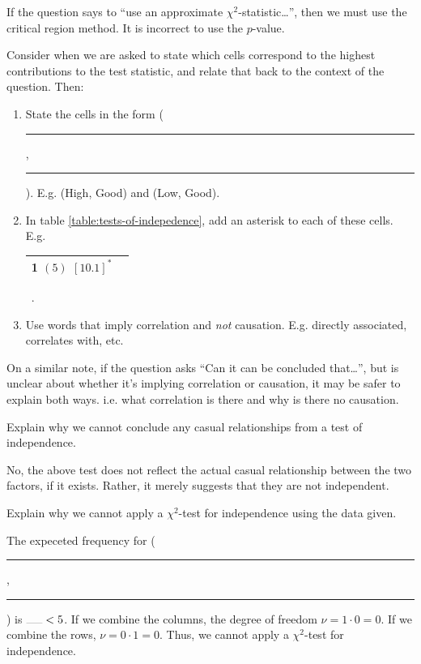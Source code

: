 \documentclass[../Notes.tex]{subfiles}
\begin{document}
\begin{note}
  If the question says to ``use an approximate \(\chi^2\)-statistic\dots'', then we must use the critical region method. It is incorrect to use the \(p\)-value.
\end{note}
\begin{note}
  Consider when we are asked to state which cells correspond to the highest contributions to the test statistic, and relate that back to the context of the question. Then:
  \begin{enumerate}
    \item State the cells in the form (\rule{0.5cm}{0.05mm},\ \rule{0.5cm}{0.05mm}). E.g. (High, Good) and (Low, Good).
    \item In table \ref{table:tests-of-indepedence}, add an asterisk to each of these cells. E.g. 
    \begin{tabular}{|Sc|}
       \((5)\) \([10.1]^{*}\)\\
      \hline
    \end{tabular}\ .
    \item Use words that imply correlation and \emph{not} causation. E.g. directly associated, correlates with, etc.
  \end{enumerate}
\end{note}
\begin{note}
  On a similar note, if the question asks ``Can it can be concluded that\dots'', but is unclear about whether it's implying correlation or causation, it may be safer to explain both ways. i.e. what correlation is there and why is there no causation. 
\end{note}
\begin{note}
  Explain why we cannot conclude any casual relationships from a test of independence.
  \begin{center}
    \parbox{0.9\textwidth}{
      No, the above test does not reflect the actual casual relationship between the two factors, if it exists. Rather, it merely suggests that they are not independent.
    }
  \end{center}
\end{note}
\begin{note}
  Explain why we cannot apply a \(\chi^2\)-test for independence using the data given.
  \begin{center}
    \parbox{0.9\textwidth}{
      The expeceted frequency for (\rule{0.5cm}{0.05mm},\ \rule{0.5cm}{0.05mm}) is \(\rule{0.5cm}{0.05mm}<5\). If we combine the columns, the degree of freedom \(\nu=1\cdot 0=0\). If we combine the rows, \(\nu=0\cdot 1=0\). Thus, we cannot apply a \(\chi^2\)-test for independence. 
    }
  \end{center}
\end{note}
\end{document}
